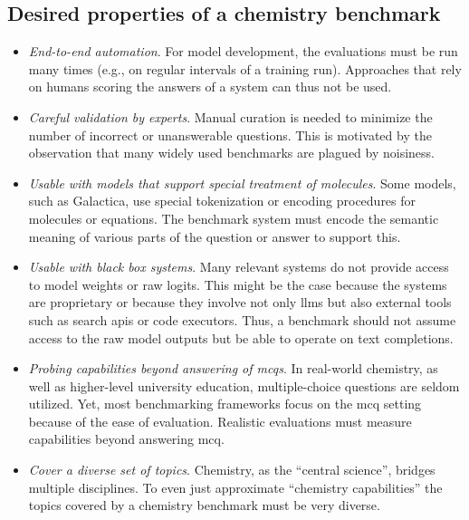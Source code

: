 
\subsection{Desired properties of a chemistry benchmark} \label{sec:desired-properties}

\begin{itemize}
    \item \emph{End-to-end automation}. For model development, the evaluations must be run many times (e.g., on regular intervals of a training run).
    Approaches that rely on humans scoring the answers of a system\autocite{Schulze_Balhorn_2024, ai4science2023impact, castro2023large} can thus not be used.
    \item \emph{Careful validation by experts}. Manual curation is needed to minimize the number of incorrect or unanswerable questions.\autocite{northcutt2021pervasive}
    This is motivated by the observation that many widely used benchmarks are plagued by noisiness.\autocite{Frye_2023, Awg}
    \item \emph{Usable with models that support special treatment of molecules}. Some models, such as Galactica\autocite{taylor2022galactica}, use special tokenization or encoding procedures for molecules or equations.
    The benchmark system must encode the semantic meaning of various parts of the question or answer to support this.
    \item \emph{Usable with black box systems}. Many relevant systems do not provide access to model weights or raw logits.
    This might be the case because the systems are proprietary or because they involve not only \glspl{llm} but also external tools such as search \glspl{api} or code executors.\autocite{schick2024toolformer, karpas2022mrkl, yao2022react}
    Thus, a benchmark should not assume access to the raw model outputs but be able to operate on text completions.
    \item \emph{Probing capabilities beyond answering of \glspl{mcq}}. In real-world chemistry, as well as higher-level university education, multiple-choice questions are seldom utilized.
    Yet, most benchmarking frameworks focus on the \gls{mcq} setting because of the ease of evaluation. Realistic evaluations must measure capabilities beyond answering \gls{mcq}.
    \item \emph{Cover a diverse set of topics}. Chemistry, as the \enquote{central science}, bridges multiple disciplines.\autocite{Aspuru_Guzik_2018} To even just approximate \enquote{chemistry capabilities} the topics covered by a chemistry benchmark must be very diverse.
\end{itemize}

